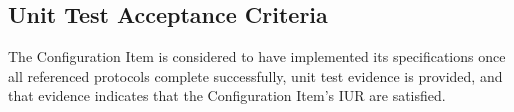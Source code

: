 \subsection{Unit Test Acceptance Criteria}
The Configuration Item is considered to have implemented its specifications
once all referenced protocols complete successfully, unit test evidence is
provided, and that evidence indicates that the Configuration Item's IUR are
satisfied.
